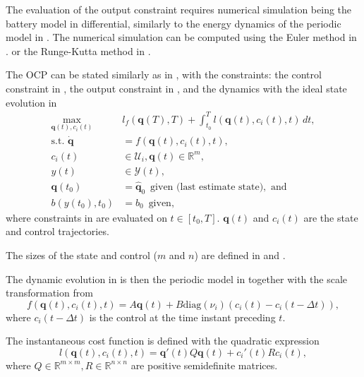 The evaluation of the output constraint requires numerical simulation being the battery model in  differential, similarly to the energy dynamics of the periodic model in . The numerical simulation can be computed using the Euler method in . or the Runge-Kutta method in .

The OCP can be stated similarly as in , with the constraints: the control constraint in , the output constraint in , and the dynamics with the ideal state evolution in 
\begin{subequations}\label{eq:ocp-output-mpc}\begin{align}
   \max_{\mathbf{q}(t),c_i(t)}&{l_f(\mathbf{q}(T),T)+\int_{t_0}^T{l(\mathbf{q}(t),c_i(t),t)\,dt}},\\
   \text{s.t. }\dot{\mathbf{q}}&=f(\mathbf{q}(t),c_i(t),t),\label{eq:dyn-evol}\\
   c_i(t)&\in\mathcal{U}_i,\mathbf{q}(t)\in\mathbb{R}^m,\label{eq:state-cont-const-mpc}\\
   y(t)&\in\mathcal{Y}(t),\label{eq:batt-const-mpc}\\
   \mathbf{q}(t_0)&=\hat{\mathbf{q}}_0\,\,\,\text{given (last estimate state)},\text{ and}\\
   b(y(t_0),t_0)&=b_0\,\,\,\text{given},
\end{align}\end{subequations}
where constraints in  are evaluated on $t\in[t_0,T]$. $\mathbf{q}(t)$ and $c_i(t)$ are the state and control trajectories. 

The sizes of the state and control ($m$ and $n$) are defined in  and . 

The dynamic evolution in  is then the periodic model in  together with the scale transformation from 
\begin{equation}\label{eq:perf-model-in-mpc}
  f(\mathbf{q}(t),c_i(t),t)=A\mathbf{q}(t)+B\mathrm{diag}(\nu_i)(c_i(t)-c_i(t-\Delta t)),
\end{equation}
where $c_i(t-\Delta t)$ is the control at the time instant preceding $t$.

The instantaneous cost function is defined with the quadratic expression
\begin{equation}\label{eq:insta-cost-mpc}
  l(\mathbf{q}(t),c_i(t),t)=\mathbf{q}'(t)Q\mathbf{q}(t)+c_i'(t)Rc_i(t),
\end{equation}
where $Q\in\mathbb{R}^{m\times m},R\in\mathbb{R}^{n\times n}$ are positive semidefinite matrices.

